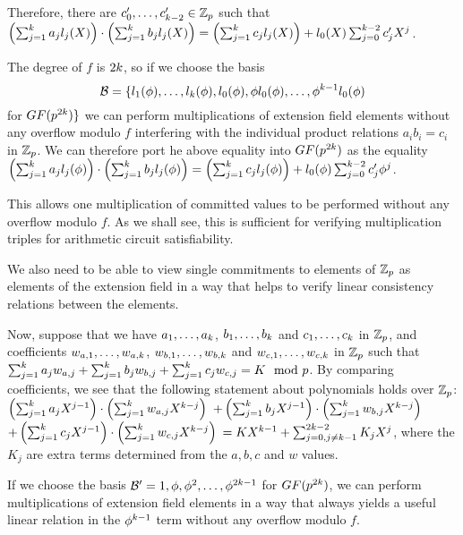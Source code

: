 {Therefore, there are $c'_0,\ldots,c'_{k-2}\in \mathbb{Z}_p$ such that $\left( \sum_{j=1}^k a_j l_j(X) \right) \cdot \left( \sum_{j=1}^k b_j l_j(X) \right) = \left( \sum_{j=1}^k c_j l_j(X) \right) + l_0(X) \sum_{j=0}^{k-2} c'_j X^j$.

The degree of $f$ is $2k$, so if we choose the basis
\[\mathcal{B} = \{ l_1(\phi),\ldots,l_k(\phi),l_0(\phi),\phi l_0(\phi),\ldots,\phi^{k-1} l_0(\phi)\]
for $GF(p^{2k}) \}$ we can perform multiplications of extension field elements without any overflow modulo $f$ interfering with the individual product relations $a_i b_i = c_i$ in $\mathbb{Z}_p$. We can therefore port he above equality into $GF(p^{2k})$ as the equality $\left( \sum_{j=1}^k a_j l_j(\phi) \right) \cdot \left( \sum_{j=1}^k b_j l_j(\phi) \right) = \left( \sum_{j=1}^k c_j l_j(\phi) \right) + l_0(\phi) \sum_{j=0}^{k-2} c'_j \phi^j$.

This allows one multiplication of committed values to be performed without any overflow modulo $f$. As we shall see, this is sufficient for verifying multiplication triples for arithmetic circuit satisfiability.

We also need to be able to view single commitments to elements of $\mathbb{Z}_p$ as elements of the extension field in a way that helps to verify linear consistency relations between the elements.

Now, suppose that we have $a_1,\ldots,a_k$, $b_1,\ldots,b_k$ and $c_1,\ldots,c_k$ in $\mathbb{Z}_p$, and coefficients $w_{a,1},\ldots,w_{a,k}$, $w_{b,1},\ldots,w_{b,k}$ and $w_{c,1},\ldots,w_{c,k}$ in $\mathbb{Z}_p$ such that $\sum_{j=1}^k a_j w_{a,j} + \sum_{j=1}^k b_j w_{b,j} + \sum_{j=1}^k c_j w_{c,j} = K\mod {p}$. By comparing coefficients, we see that the following statement about polynomials holds over $\mathbb{Z}_p$:
$\left( \sum_{j=1}^k a_j X^{j-1} \right) \cdot \left( \sum_{j=1}^k w_{a,j} X^{k-j} \right) $ $
+ \left( \sum_{j=1}^k b_j X^{j-1} \right) \cdot \left( \sum_{j=1}^k w_{b,j} X^{k-j} \right) $ $
+ \left( \sum_{j=1}^k c_j X^{j-1} \right) \cdot \left( \sum_{j=1}^k w_{c,j} X^{k-j} \right) $ $
= K X^{k-1} + \sum_{j=0,j\neq k-1}^{2k-2} K_jX^j
$, where the $K_j$ are extra terms determined from the $a,b,c$ and $w$ values.

If we choose the basis $\mathcal{B}' = 1,\phi,\phi^2,\ldots,\phi^{2k-1}$ for $GF(p^{2k})$, we can perform multiplications of extension field elements in a way that always yields a useful linear relation in the $\phi^{k-1}$ term without any overflow modulo $f$.

}
